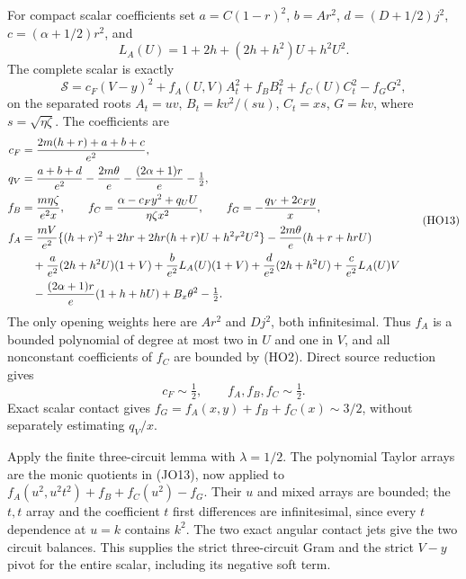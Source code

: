 For compact scalar coefficients set
$a=C(1-r)^2$, $b=Ar^2$, $d=(D+1/2)j^2$,
$c=(\alpha+1/2)r^2$, and
\[
 L_A(U)=1+2h+(2h+h^2)U+h^2U^2 .
 \]
The complete scalar is exactly
\[
 \mathcal S=c_F(V-y)^2+f_A(U,V)A_t^2+f_BB_t^2+
                         f_C(U)C_t^2-f_GG^2 ,
 \tag{HO12}
\]
on the separated roots
$A_t=uv$, $B_t=kv^2/(su)$, $C_t=xs$, $G=kv$,
where $s=\sqrt{\eta\zeta}$. The coefficients are
\[
 \begin{aligned}
 c_F&={2m(h+r)+a+b+c\over e^2},\\
 q_V&={a+b+d\over e^2}-{2m\theta\over e}
                       -{(2\alpha+1)r\over e}-\tfrac12,\\
 f_B&={m\eta\zeta\over e^2x},\qquad
 f_C={\alpha-c_Fy^2+q_UU\over\eta\zeta x^2},\qquad
 f_G=-{q_V+2c_Fy\over x},\\
 f_A&={mV\over e^2}
 \{(h+r)^2+2hr+2hr(h+r)U+h^2r^2U^2\}
       -{2m\theta\over e}(h+r+hrU)\\
 &\quad+{a\over e^2}(2h+h^2U)(1+V)
       +{b\over e^2}L_A(U)(1+V)
       +{d\over e^2}(2h+h^2U)+{c\over e^2}L_A(U)V\\
 &\quad-{(2\alpha+1)r\over e}(1+h+hU)
                              +B_x\theta^2-\tfrac12 .
 \end{aligned}
 \tag{HO13}
\]
The only opening weights here are $Ar^2$ and $Dj^2$, both
infinitesimal. Thus $f_A$ is a bounded polynomial of degree at most
two in $U$ and one in $V$, and all nonconstant coefficients of
$f_C$ are bounded by (HO2). Direct source reduction gives
\[
 c_F\sim\tfrac12,\qquad f_A,f_B,f_C\sim\tfrac12 .
 \tag{HO14}
\]
Exact scalar contact gives
$f_G=f_A(x,y)+f_B+f_C(x)\sim3/2$, without separately estimating
$q_V/x$.

Apply the finite three-circuit lemma with $\lambda=1/2$.
The polynomial Taylor arrays are the monic quotients in (JO13),
now applied to
$f_A(u^2,u^2t^2)+f_B+f_C(u^2)-f_G$.
Their $u$ and mixed arrays are bounded; the $t,t$ array and the
coefficient $t$ first differences are infinitesimal, since every
$t$ dependence at $u=k$ contains $k^2$.
The two exact angular contact jets give the two circuit balances.
This supplies the strict three-circuit Gram and the strict
$V-y$ pivot for the entire scalar, including its negative soft term.

